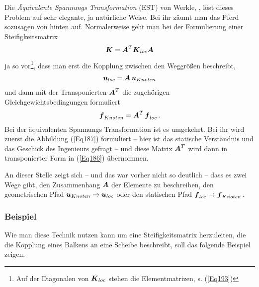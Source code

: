 Die  {\em \"{A}quivalente Spannungs Transformation\/} (EST) von Werkle, \cite{Werkle1}, l\"{o}st dieses Problem auf sehr elegante, ja nat\"{u}rliche Weise. Bei ihr z\"{a}umt man das Pferd sozusagen von hinten auf. Normalerweise geht man bei der Formulierung einer Steifigkeitsmatrix
\begin{align}
\mbox{\boldmath $K$} = \mbox{\boldmath $A$}^T\mbox{\boldmath $K$}_{loc} \mbox{\boldmath $A$}
\end{align}
ja so vor\footnote{Auf der Diagonalen von $\mbox{\boldmath $K$}_{loc} $ stehen die Elementmatrizen, s. (\ref{Eq193}) }, dass man erst die Kopplung zwischen den Weggr\"{o}{\ss}en beschreibt,
\begin{align} \label{Eq186}
\mbox{\boldmath $u$}_{loc} = \mbox{\boldmath $A$}\,\mbox{\boldmath $u$}_{Knoten}
\end{align}
und dann mit der Transponierten $\mbox{\boldmath $A$}^T$ die zugeh\"{o}rigen Gleichgewichtsbedingungen formuliert
\begin{align} \label{Eq187}
\mbox{\boldmath $f$}_{Knoten} = \mbox{\boldmath $A$}^T\,\mbox{\boldmath $f$}_{loc}\,.
\end{align}
Bei der \"{a}quivalenten Spannungs Transformation ist es umgekehrt. Bei ihr wird zuerst die Abbildung (\ref{Eq187}) formuliert -- hier ist das statische Verst\"{a}ndnis und das Geschick des Ingenieurs gefragt -- und diese Matrix $\mbox{\boldmath $A$}^T$ wird dann in transponierter Form in (\ref{Eq186}) \"{u}bernommen.

An dieser Stelle zeigt sich -- und das war vorher nicht so deutlich -- dass es zwei Wege gibt, den Zusammenhang $\mbox{\boldmath $A$}$ der Elemente zu beschreiben, den geometrischen Pfad $\mbox{\boldmath $u$}_{Knoten} \to \mbox{\boldmath $u$}_{loc}$ oder den statischen Pfad $\mbox{\boldmath $f$}_{loc} \to \mbox{\boldmath $f$}_{Knoten}$.\\


\textcolor{chapterTitleBlue}{\subsubsection*{Beispiel}}

Wie man diese Technik nutzen kann um eine Steifigkeitsmatrix herzuleiten, die die Kopplung eines Balkens an eine Scheibe beschreibt, soll das folgende Beispiel zeigen.

